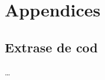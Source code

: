 \documentclass[12pt,a4paper]{report}
\begin{document}


\chapter*{Appendices}
\begin{appendices}

\chapter{Extrase de cod} %
\ldots


\end{appendices}
\end{document}
